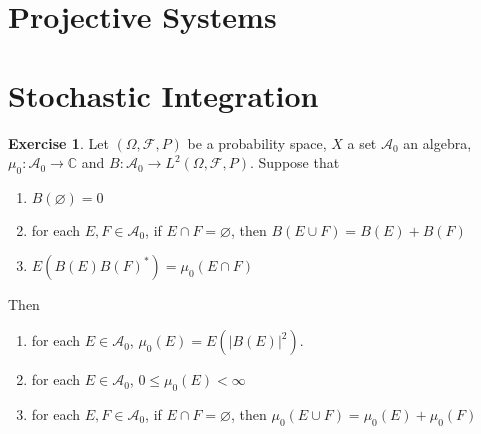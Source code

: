 \documentclass[12pt]{amsart}
\theoremstyle{definition}
\newtheorem{ex}[definition]{Exercise}
\newcommand{\Om}{\Omega}
\newcommand{\C}{\mathbb{C}}
\newcommand{\MA}{\mathcal{A}}
\newcommand{\MF}{\mathcal{F}}
\begin{document}
	
	
	
	
	
	
	
	
	
	
	
	
	
	
	
	
	
	
	
	
	
	
	
	
	
	
	
	
	
	
	
	
	
	\newpage
	\section{Projective Systems}
	
	
	
	
	
	
	
	
	
	
	
	
	
	
	
	
	
	
	
	
	
	
	
	
	
	
	
	
	
	
	
	
	
	
	\newpage
	\section{Stochastic Integration}
	\begin{ex}
	Let $(\Om, \MF, P)$ be a probability space, $X$ a set $\MA_0$ an algebra, $\mu_0:\MA_0 \rightarrow \C$ and $B:\MA_0 \rightarrow L^2(\Om, \MF, P)$. 
	Suppose that 
	\begin{enumerate}
	\item $B(\varnothing) = 0$
	\item for each $E, F \in \MA_0$, if $E \cap F = \varnothing$, then $B(E \cup F) = B(E) + B(F)$
	\item $E(B(E)B(F)^*) = \mu_0(E \cap F)$
	\end{enumerate}
	Then 
	\begin{enumerate}
	\item for each $E \in \MA_0$, $\mu_0(E) = E(|B(E)|^2)$.
	\item for each $E \in \MA_0$, $0 \leq \mu_0(E) < \infty$ 
	\item for each $E, F \in \MA_0$, if $E \cap F = \varnothing$, then $\mu_0(E \cup F) = \mu_0(E) + \mu_0(F)$
	\end{enumerate}
	\end{ex}
	
\end{document}
